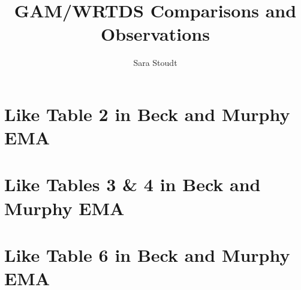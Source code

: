 \documentclass[12pt]{amsart}
\title{GAM/WRTDS Comparisons and Observations}
\author{Sara Stoudt}
\begin{document}
\maketitle


\section{Like Table 2 in Beck and Murphy EMA}





\section{Like Tables 3 \& 4 in Beck and Murphy EMA}




\section{Like Table 6 in Beck and Murphy EMA}



\end{document}
